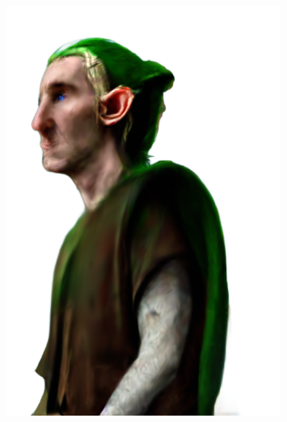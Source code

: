 \begin{figure}
\begin{subfigure}{0.18\linewidth}
        \includegraphics[width=\textwidth]{Figures/failed/igs2gs_1/27_render.png}
	\end{subfigure}
    \begin{subfigure}{0.18\linewidth}

\end{subfigure}
\end{figure}
